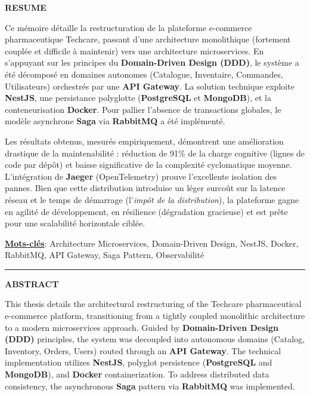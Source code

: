 
    \begin{center}
        \textbf{\large RESUME}\label{page:resume}
    \end{center}
    
    Ce mémoire détaille la restructuration de la plateforme e-commerce pharmaceutique Techcare, passant d'une architecture monolithique (fortement couplée et difficile à maintenir) vers une architecture microservices. En s'appuyant sur les principes du \textbf{Domain-Driven Design (DDD)}, le système a été décomposé en domaines autonomes (Catalogue, Inventaire, Commandes, Utilisateurs) orchestrés par une \textbf{API Gateway}. La solution technique exploite \textbf{NestJS}, une persistance polyglotte (\textbf{PostgreSQL} et \textbf{MongoDB}), et la conteneurisation \textbf{Docker}. Pour pallier l'absence de transactions globales, le modèle asynchrone \textbf{Saga} via \textbf{RabbitMQ} a été implémenté.
    
    Les résultats obtenus, mesurés empiriquement, démontrent une amélioration drastique de la maintenabilité : réduction de 91\% de la charge cognitive (lignes de code par dépôt) et baisse significative de la complexité cyclomatique moyenne. L'intégration de \textbf{Jaeger} (OpenTelemetry) prouve l'excellente isolation des pannes. Bien que cette distribution introduise un léger surcoût sur la latence réseau et le temps de démarrage (l'\textit{impôt de la distribution}), la plateforme gagne en agilité de développement, en résilience (dégradation gracieuse) et est prête pour une scalabilité horizontale ciblée.

    \vspace{0.3cm}

    \textbf{\underline{Mots-clés}}: Architecture Microservices, Domain-Driven Design, NestJS, Docker, RabbitMQ, API Gateway, Saga Pattern, Observabilité
    
    \vspace{0.5cm}
    \noindent\rule{\textwidth}{0.4pt}
    \vspace{0.5cm}

    \begin{center}
        {\large\bfseries ABSTRACT}
    \end{center}
    \label{page:abstract}

    This thesis details the architectural restructuring of the Techcare pharmaceutical e-commerce platform, transitioning from a tightly coupled monolithic architecture to a modern microservices approach. Guided by \textbf{Domain-Driven Design (DDD)} principles, the system was decoupled into autonomous domains (Catalog, Inventory, Orders, Users) routed through an \textbf{API Gateway}. The technical implementation utilizes \textbf{NestJS}, polyglot persistence (\textbf{PostgreSQL} and \textbf{MongoDB}), and \textbf{Docker} containerization. To address distributed data consistency, the asynchronous \textbf{Saga} pattern via \textbf{RabbitMQ} was implemented.
    
